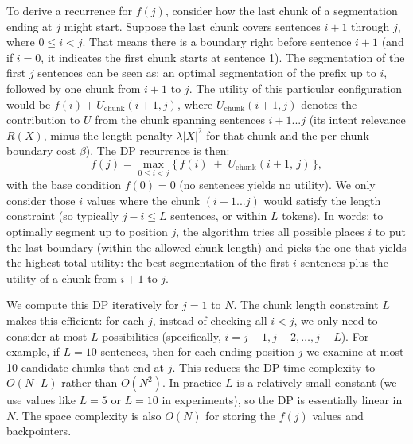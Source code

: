 \documentclass[12pt,a4paper]{report}
\begin{document}
To derive a recurrence for $f(j)$, consider how the last chunk of a segmentation ending at $j$ might start. Suppose the last chunk covers sentences $i+1$ through $j$, where $0 \le i < j$. That means there is a boundary right before sentence $i+1$ (and if $i=0$, it indicates the first chunk starts at sentence 1). The segmentation of the first $j$ sentences can be seen as: an optimal segmentation of the prefix up to $i$, followed by one chunk from $i+1$ to $j$. The utility of this particular configuration would be $f(i) + U_{\text{chunk}}(i+1, j)$, where $U_{\text{chunk}}(i+1, j)$ denotes the contribution to $U$ from the chunk spanning sentences $i+1$...$j$ (its intent relevance $R(X)$, minus the length penalty $\lambda|X|^2$ for that chunk and the per-chunk boundary cost $\beta$). The DP recurrence is then:
\[ 
   f(j) = \max_{0 \le i < j} \Big\{\, f(i)\;+\;U_{\text{chunk}}(i+1,\, j) \,\Big\},
\] 
with the base condition $f(0) = 0$ (no sentences yields no utility). We only consider those $i$ values where the chunk $(i+1...j)$ would satisfy the length constraint (so typically $j-i \le L$ sentences, or within $L$ tokens). In words: to optimally segment up to position $j$, the algorithm tries all possible places $i$ to put the last boundary (within the allowed chunk length) and picks the one that yields the highest total utility: the best segmentation of the first $i$ sentences plus the utility of a chunk from $i+1$ to $j$.

We compute this DP iteratively for $j=1$ to $N$. The chunk length constraint $L$ makes this efficient: for each $j$, instead of checking all $i<j$, we only need to consider at most $L$ possibilities (specifically, $i = j-1, j-2, \dots, j-L$). For example, if $L=10$ sentences, then for each ending position $j$ we examine at most 10 candidate chunks that end at $j$. This reduces the DP time complexity to $O(N \cdot L)$ rather than $O(N^2)$. In practice $L$ is a relatively small constant (we use values like $L=5$ or $L=10$ in experiments), so the DP is essentially linear in $N$. The space complexity is also $O(N)$ for storing the $f(j)$ values and backpointers.
\end{document}
